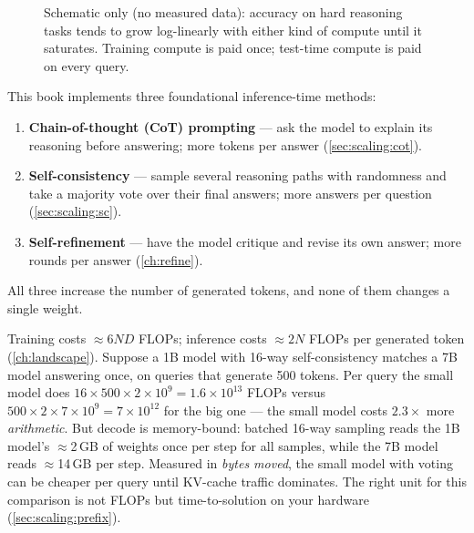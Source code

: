 \begin{figure}[t]
\centering
{}
\caption{Schematic only (no measured data): accuracy on hard reasoning tasks tends to grow
log-linearly with either kind of compute until it saturates. Training compute is paid once;
test-time compute is paid on every query.}
\label{fig:scaling:twoaxes}
\end{figure}

This book implements three foundational inference-time methods:
\begin{enumerate}
  \item \textbf{Chain-of-thought (CoT) prompting} --- ask the model to explain its reasoning before
  answering; more tokens per answer (\cref{sec:scaling:cot}).
  \item \textbf{Self-consistency} --- sample several reasoning paths with randomness and take a
  majority vote over their final answers; more answers per question (\cref{sec:scaling:sc}).
  \item \textbf{Self-refinement} --- have the model critique and revise its own answer; more rounds
  per answer (\cref{ch:refine}).
\end{enumerate}
All three increase the number of generated tokens, and none of them changes a single weight.

\begin{napkinmath}
Training costs $\approx 6ND$ FLOPs; inference costs $\approx 2N$ FLOPs per generated token
(\cref{ch:landscape}). Suppose a 1B model with 16-way self-consistency matches a 7B model answering
once, on queries that generate 500 tokens. Per query the small model does
$16 \times 500 \times 2 \times 10^9 = 1.6 \times 10^{13}$ FLOPs versus
$500 \times 2 \times 7\times10^9 = 7 \times 10^{12}$ for the big one --- the small model costs
$2.3\times$ more \emph{arithmetic}. But decode is memory-bound: batched 16-way sampling reads the
1B model's $\approx$2\,GB of weights once per step for all samples, while the 7B model reads
$\approx$14\,GB per step. Measured in \emph{bytes moved}, the small model with voting can be cheaper
per query until KV-cache traffic dominates. The right unit for this comparison is not FLOPs but
time-to-solution on your hardware (\cref{sec:scaling:prefix}).
\end{napkinmath}

